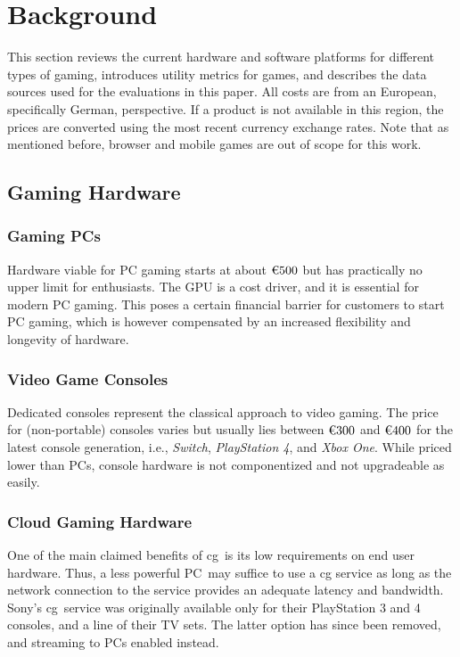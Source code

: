 \section{Background}
\label{sec:background}

This section reviews the current hardware and software platforms
for different types of gaming, introduces utility metrics for games,
and describes the data sources used for the evaluations in this paper.
All costs are from an European, specifically German, perspective. If a
product is not available in this region, the prices are converted using
the most recent currency exchange rates.
Note that as mentioned before, browser and mobile games are out
of scope for this work.



\subsection{Gaming Hardware}

\subsubsection{Gaming \acrshort{PC}s}
Hardware viable for \gls{PC} gaming starts at about $\text{\texteuro} 500$ but
has practically no upper limit for enthusiasts. The \gls{GPU}
is a cost driver, and it is essential for modern \gls{PC} gaming.
This poses a certain financial barrier for customers to start \gls{PC} gaming,
which is however compensated by an increased flexibility and longevity of
hardware.

\subsubsection{Video Game Consoles}
Dedicated consoles represent the classical approach to video gaming.
The price for (non-portable) consoles varies but usually lies between
$\text{\texteuro} 300$ and $\text{\texteuro} 400$ for the latest console
generation, i.e., \textit{Switch}, \textit{PlayStation 4}, and
\textit{Xbox One}.
While priced lower than \glspl{PC}, console hardware is not componentized
and not upgradeable as easily.

\subsubsection{Cloud Gaming Hardware}
One of the main claimed benefits of \gls{cg} is its low requirements
on end user hardware. Thus, a less powerful \gls{PC} may suffice to
use a \gls{cg} service as long as the network connection to the
service provides an adequate latency and bandwidth.
Sony's \psnow \gls{cg} service was originally available only for their
PlayStation 3 and 4 consoles, and a line of their TV sets. The latter
option has since been removed, and streaming to \glspl{PC} enabled
instead.

